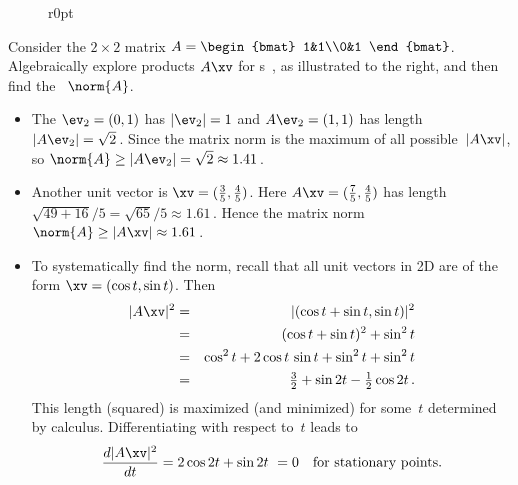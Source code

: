 \begin{figure}r{0pt}  \end{figure}
\begin{example} 
Consider the \(2\times2\) matrix \(A=\begin{bmat} 1&1\\0&1 \end{bmat}\).
Algebraically explore products \(A\xv\) for s~\xv, as illustrated to the right, 
and then find the ~\(\norm{A}\).

\begin{itemize}
\item The  \(\ev_2=(0,1)\) has \(|\ev_2|=1\) and \(A\ev_2=(1,1)\) has length \(|A\ev_2|=\sqrt2\)\,.
Since the matrix norm is the maximum of all possible~\(|A\xv|\), so \(\norm{A}\geq|A\ev_2|=\sqrt2\approx 1.41\)\,.

\item Another unit vector is \(\xv=(\tfrac35,\tfrac45)\).
Here \(A\xv=(\tfrac75,\tfrac45)\) has length \(\sqrt{49+16}/5=\sqrt{65}/5\approx1.61\)\,.
Hence the matrix norm \(\norm{A}\geq|A\xv|\approx 1.61\)\,.

\fixwrapitem

\item To systematically find the norm, recall that all unit vectors in 2D are of the form \(\xv=(\cos t,\sin t)\).
Then
\begin{eqnarray*}
|A\xv|^2&=&|(\cos t+\sin t,\sin t)|^2
\\&=&(\cos t+\sin t)^2+\sin^2 t
\\&=&\cos^2 t+2\cos t\,\sin t+\sin^2t+\sin^2 t
\\&=&\tfrac32+\sin 2t-\tfrac12\cos 2t\,.
\end{eqnarray*}
This length (squared) is maximized (and minimized) for some~\(t\) determined by calculus.
Differentiating with respect to~\(t\)  leads to
\begin{equation*}
\frac{d|A\xv|^2}{dt}=2\cos2t+\sin 2t \ =0\quad\text{for stationary points.}
\end{equation*}


\end{itemize}
\end{example}
